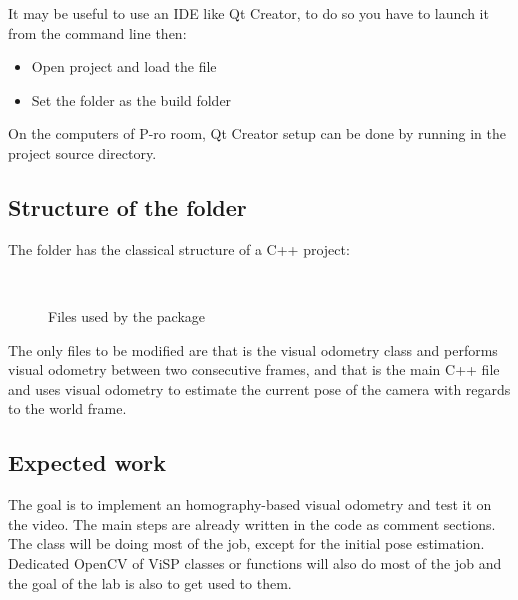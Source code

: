 \documentclass{ecnreport}
\begin{document}
It may be useful to use an IDE like Qt Creator, to do so you have to launch it from the command line then:
\begin{itemize}
 \item Open project and load the  file
 \item Set the  folder as the build folder
\end{itemize}
On the computers of P-ro room, Qt Creator setup can be done by running  in the project source directory.
 

\subsection{Structure of the  folder}

The folder has the classical structure of a C++ project:
\begin{figure}[h]\centering
\begin{minipage}{.05\linewidth} ~ \end{minipage}
\begin{minipage}{.75\linewidth}
\end{minipage}
\caption{Files used by the package}
\end{figure}

The only files to be modified are  that is the visual odometry class and performs visual odometry between two consecutive frames, and  that is the main 
C++ file and uses visual odometry to estimate the current pose of the camera with regards to the world frame.


\subsection{Expected work}

The goal is to implement an homography-based visual odometry and test it on the  video.
The main steps are already written in the code as comment sections. The  class will be doing most of the job, except for the initial pose estimation. 
Dedicated OpenCV of ViSP classes or functions will also do most of the job and the goal of the lab is also to get used to them.
\end{document}
